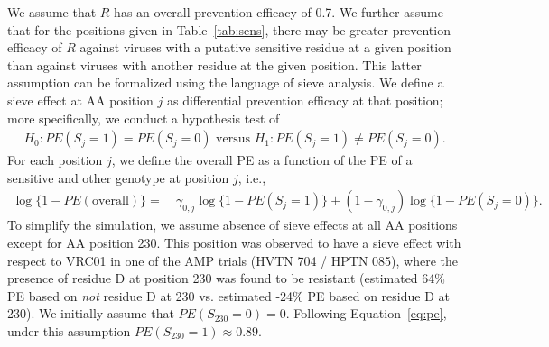 \documentclass[10pt]{article}
\begin{document}
We assume that $R$ has an overall prevention efficacy of 0.7. We further assume that for the positions given in Table~\ref{tab:sens}, there may be greater prevention efficacy of $R$ against viruses with a putative sensitive residue at a given position than against viruses with another residue at the given position. This latter assumption can be formalized using the language of sieve analysis. We define a sieve effect at AA position $j$ as differential prevention efficacy at that position; more specifically, we conduct a hypothesis test of
\begin{align*}
  H_0: PE(S_j = 1) = PE(S_j = 0) \text{ versus } H_1: PE(S_j = 1) \neq PE(S_j = 0).
\end{align*}
For each position $j$, we define the overall PE as a function of the PE of a sensitive and other genotype at position $j$, i.e.,
\begin{align}
  \log \{1 - PE(\text{overall})\} =& \ \gamma_{0,j} \log \{1 - PE(S_j = 1)\} + (1 - \gamma_{0,j}) \log \{1 - PE(S_j = 0)\}. \label{eq:pe}
\end{align}
To simplify the simulation, we assume absence of sieve effects at all AA positions except for AA position 230. This position was observed to have a sieve effect with respect to VRC01 in one of the AMP trials (HVTN 704 / HPTN 085), where the presence of residue D at position 230 was found to be resistant (estimated 64\% PE based on \emph{not} residue D at 230 vs. estimated -24\% PE based on residue D at 230). We initially assume that $PE(S_{230} = 0) = 0$. Following Equation~\eqref{eq:pe}, under this assumption $PE(S_{230} = 1) \approx 0.89$.
\end{document}
